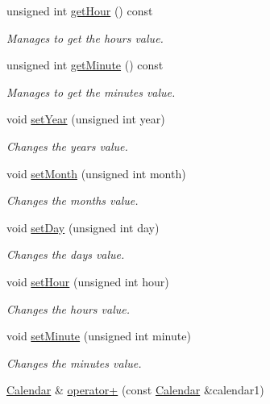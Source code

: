 \begin{DoxyCompactItemize}
unsigned int \hyperlink{class_calendar_a292aca906edaeeca39d981917fb87de7}{get\+Hour} () const
\begin{DoxyCompactList}\small\item\em Manages to get the hour\textquotesingle{}s value. \end{DoxyCompactList}\item 
unsigned int \hyperlink{class_calendar_a07c02433f8725c8b052202515023b50a}{get\+Minute} () const
\begin{DoxyCompactList}\small\item\em Manages to get the minute\textquotesingle{}s value. \end{DoxyCompactList}\item 
void \hyperlink{class_calendar_a22194fd8dcdc4c083f7a870c8a476f75}{set\+Year} (unsigned int year)
\begin{DoxyCompactList}\small\item\em Changes the year\textquotesingle{}s value. \end{DoxyCompactList}\item 
void \hyperlink{class_calendar_a66115274b1543b8a393d4cd92195e746}{set\+Month} (unsigned int month)
\begin{DoxyCompactList}\small\item\em Changes the month\textquotesingle{}s value. \end{DoxyCompactList}\item 
void \hyperlink{class_calendar_a84834635f8245a0b2f9ae69b4f31382e}{set\+Day} (unsigned int day)
\begin{DoxyCompactList}\small\item\em Changes the day\textquotesingle{}s value. \end{DoxyCompactList}\item 
void \hyperlink{class_calendar_a6f3e8a86bdbf5ad261084b91a6f880e7}{set\+Hour} (unsigned int hour)
\begin{DoxyCompactList}\small\item\em Changes the hour\textquotesingle{}s value. \end{DoxyCompactList}\item 
void \hyperlink{class_calendar_a94365aea1df3a5085054d61bfa893e41}{set\+Minute} (unsigned int minute)
\begin{DoxyCompactList}\small\item\em Changes the minute\textquotesingle{}s value. \end{DoxyCompactList}\item 
\hyperlink{class_calendar}{Calendar} \& \hyperlink{class_calendar_aebeae7e3eb616dc294ae6f026f5776bf}{operator+} (const \hyperlink{class_calendar}{Calendar} \&calendar1)

\end{DoxyCompactItemize}
